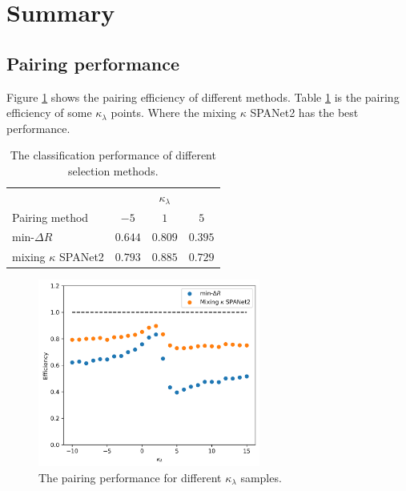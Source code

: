 \documentclass[12pt]{article}
\begin{document}
\section{Summary}%
\label{sec:summary2}
	\subsection{Pairing performance}%
	\label{sub:pairing_performance2}
	Figure \ref{fig:pairing_performance_kappa2} shows the pairing efficiency of different methods. Table \ref{tab:pairing_performance_kappa} is the pairing efficiency of some $\kappa_\lambda$ points. Where the mixing $\kappa$ SPANet2 has the best performance.
		\begin{table}[htpb]
			\centering
			\caption{The classification performance of different selection methods.}
			\label{tab:pairing_performance_kappa}
			\begin{tabular}{l|ccc}
			& \multicolumn{3}{c}{$\kappa_\lambda$} \\
			Pairing method          & $-5$    & $1$     & $5$  \\ \hline
			$\text{min-}\Delta R$ 	& $0.644$ & $0.809$ & $0.395$  \\
			mixing $\kappa$ SPANet2 & $0.793$ & $0.885$ & $0.729$
			\end{tabular}			
		\end{table}

		\begin{figure}[htpb]
			\centering
			\includegraphics[width=0.65\textwidth]{pairing_efficiency_kappa-mindR-SPANet2.png}
			\caption{The pairing performance for different $\kappa_\lambda$ samples.}
			\label{fig:pairing_performance_kappa2}
		\end{figure}

\end{document}
